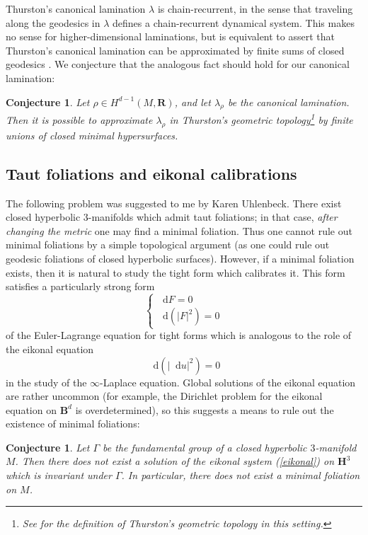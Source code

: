 \documentclass[reqno,11pt]{amsart}
\newcommand{\RR}{\mathbf{R}}
\newcommand{\Hyp}{\mathbf H}
\newcommand{\Ball}{\mathbf{B}}
\newcommand*\dif{\mathop{}\!\mathrm{d}}
\newtheorem{conjecture}[theorem]{Conjecture}
\theoremstyle{definition}
\numberwithin{equation}{section}
\begin{document}
Thurston's canonical lamination $\lambda$ is chain-recurrent, in the sense that traveling along the geodesics in $\lambda$ defines a chain-recurrent dynamical system.
This makes no sense for higher-dimensional laminations, but is equivalent to assert that Thurston's canonical lamination can be approximated by finite sums of closed geodesics \cite[\S9]{Gu_ritaud_2017}.
We conjecture that the analogous fact should hold for our canonical lamination:

\begin{conjecture}\label{chain recurrence}
Let $\rho \in H^{d - 1}(M, \RR)$, and let $\lambda_\rho$ be the canonical lamination.
Then it is possible to approximate $\lambda_\rho$ in Thurston's geometric topology\footnote{See \cite[\S1]{BackusCML} for the definition of Thurston's geometric topology in this setting.} by finite unions of closed minimal hypersurfaces.
\end{conjecture}

\subsection{Taut foliations and eikonal calibrations}
The following problem was suggested to me by Karen Uhlenbeck. 
There exist closed hyperbolic $3$-manifolds which admit taut foliations; in that case, \emph{after changing the metric} one may find a minimal foliation.
Thus one cannot rule out minimal foliations by a simple topological argument (as one could rule out geodesic foliations of closed hyperbolic surfaces).
However, if a minimal foliation exists, then it is natural to study the tight form which calibrates it.
This form satisfies a particularly strong form 
\begin{equation}\label{eikonal}
\begin{cases}\dif F = 0 \\ \dif(|F|^2) = 0\end{cases}
\end{equation}
of the Euler-Lagrange equation for tight forms which is analogous to the role of the eikonal equation
$$\dif(|\dif u|^2) = 0$$
in the study of the $\infty$-Laplace equation.
Global solutions of the eikonal equation are rather uncommon (for example, the Dirichlet problem for the eikonal equation on $\Ball^d$ is overdetermined), so this suggests a means to rule out the existence of minimal foliations:

\begin{conjecture}\label{Karen}
Let $\Gamma$ be the fundamental group of a closed hyperbolic $3$-manifold $M$.
Then there does not exist a solution of the eikonal system (\ref{eikonal}) on $\Hyp^3$ which is invariant under $\Gamma$.
In particular, there does not exist a minimal foliation on $M$.
\end{conjecture}
\end{document}
